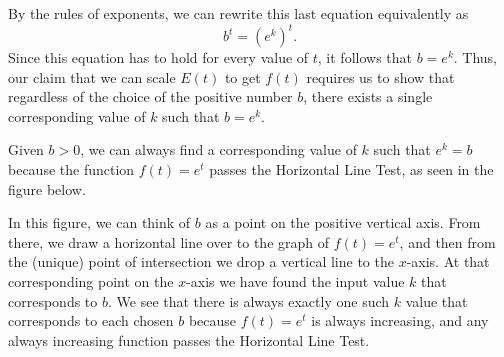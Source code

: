\documentclass[nooutcomes]{ximera}
\begin{document}
By the rules of exponents, we can rewrite this last equation equivalently as%
\begin{equation*}
b^t = (e^k)^t\text{.}
\end{equation*}
Since this equation has to hold for every value of $t$, it follows that $b = e^k$.  Thus, our claim that we can scale $E(t)$ to get $f(t)$ requires us to show that regardless of the choice of the positive number $b$, there exists a single corresponding value of $k$ such that $b = e^k$.

Given $b > 0$, we can always find a corresponding value of $k$ such that $e^k = b$ because the function $f(t) = e^t$ passes the Horizontal Line Test, as seen in the figure below.


\begin{image}
\end{image}

In this figure, we can think of $b$ as a point on the positive vertical axis.  From there, we draw a horizontal line over to the graph of $f(t) = e^t$, and then from the (unique) point of intersection we drop a vertical line to the $x$-axis.  At that corresponding point on the $x$-axis we have found the input value $k$ that corresponds to $b$.  We see that there is always exactly one such $k$ value that corresponds to each chosen $b$ because $f(t) = e^t$ is always increasing, and any always increasing function passes the Horizontal Line Test.
\end{document}
